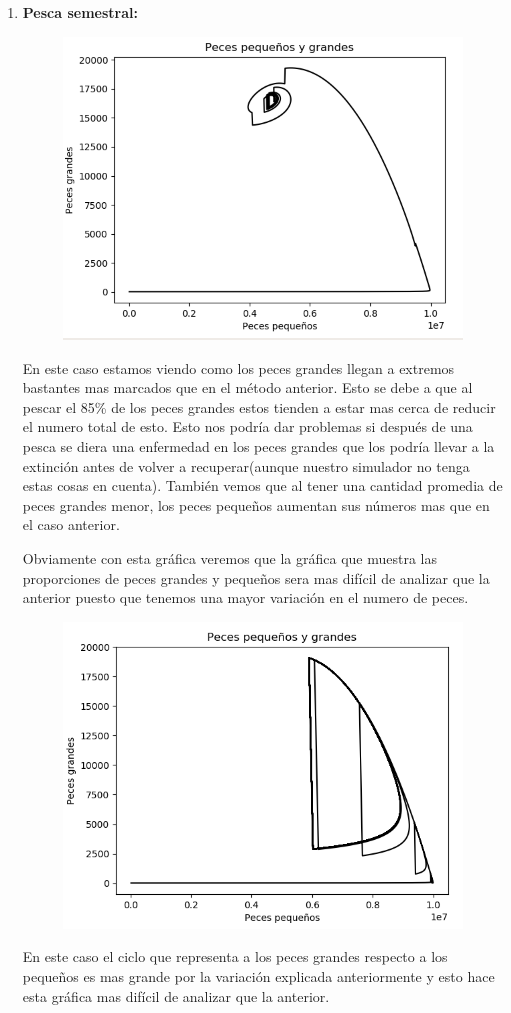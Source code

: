 \documentclass[]{article}
\begin{document}
\begin{enumerate}
	\item \textbf{Pesca semestral:}
	\begin{figure}[H]
		\centering
		\includegraphics[width=0.7\linewidth]{img/screenshot0027}
		\caption{}
		\label{fig:screenshot0027}
	\end{figure}
	En este caso estamos viendo como los peces grandes llegan a extremos bastantes mas marcados que en el método anterior. Esto se debe a que al pescar el 85\% de los peces grandes estos tienden a estar mas cerca de reducir el numero total de esto. Esto nos podría dar problemas si después de una pesca se diera una enfermedad en los peces grandes que los podría llevar a la extinción antes de volver a recuperar(aunque nuestro simulador no tenga estas cosas en cuenta). También vemos que al tener una cantidad promedia de peces grandes menor, los peces pequeños aumentan sus números mas que en el caso anterior. 
	
	Obviamente con esta gráfica veremos que la gráfica que muestra las proporciones de peces grandes y pequeños sera mas difícil de analizar que la anterior puesto que tenemos una mayor variación en el numero de peces.
	
	\begin{figure}[H]
		\centering
		\includegraphics[width=0.7\linewidth]{img/screenshot0029}
		\caption{}
		\label{fig:screenshot0029}
	\end{figure}
	En este caso el ciclo que representa a los peces grandes respecto a los pequeños es mas grande por la variación explicada anteriormente y esto hace esta gráfica mas difícil de analizar que la anterior.
\end{enumerate}










 
 
	
\end{document}
